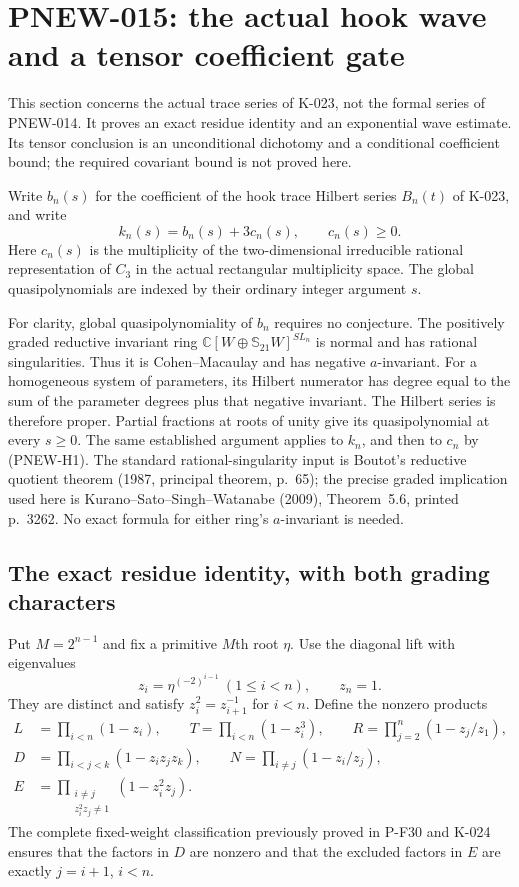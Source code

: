 \section{PNEW-015: the actual hook wave and a tensor coefficient gate}
\label{sec:hook-covariant-gate}

This section concerns the actual trace series of K-023, not the formal
series of PNEW-014. It proves an exact residue identity and an
exponential wave estimate. Its tensor conclusion is an unconditional
dichotomy and a conditional coefficient bound; the required covariant
bound is not proved here.

Write $b_n(s)$ for the coefficient of the hook trace Hilbert series
$B_n(t)$ of K-023, and write
\[
       k_n(s)=b_n(s)+3c_n(s),\qquad c_n(s)\ge0.
                                                        \tag{PNEW-H1}
\]
Here $c_n(s)$ is the multiplicity of the two-dimensional irreducible
rational representation of $C_3$ in the actual rectangular multiplicity
space. The global quasipolynomials are indexed by their ordinary
integer argument $s$.

For clarity, global quasipolynomiality of $b_n$ requires no conjecture.
The positively graded reductive invariant ring
$\mathbb C[W\oplus\mathbb S_{21}W]^{SL_n}$ is normal and has rational
singularities. Thus it is Cohen--Macaulay and has negative $a$-invariant.
For a homogeneous system of parameters, its Hilbert numerator has
degree equal to the sum of the parameter degrees plus that negative
invariant. The Hilbert series is therefore proper. Partial fractions
at roots of unity give its quasipolynomial at every $s\ge0$.
The same established argument applies to $k_n$, and then to $c_n$
by (PNEW-H1). The standard rational-singularity input is Boutot's
reductive quotient theorem (1987, principal theorem, p.~65); the precise
graded implication used here is Kurano--Sato--Singh--Watanabe (2009),
Theorem~5.6, printed p.~3262.
No exact formula for either ring's $a$-invariant is needed.

\subsection*{The exact residue identity, with both grading characters}

Put $M=2^{n-1}$ and fix a primitive $M$th root $\eta$. Use the
diagonal lift with eigenvalues
\[
 z_i=\eta^{(-2)^{i-1}}\ (1\le i<n),\qquad z_n=1.
\]
They are distinct and satisfy $z_i^2=z_{i+1}^{-1}$ for $i<n$.
Define the nonzero products
\[
 \begin{split}
 L&=\prod_{i<n}(1-z_i),\qquad
 T=\prod_{i<n}(1-z_i^3),\qquad
 R=\prod_{j=2}^n(1-z_j/z_1),\\
 D&=\prod_{i<j<k}(1-z_i z_j z_k),\qquad
 N=\prod_{i\ne j}(1-z_i/z_j),\\
 E&=\prod_{\substack{i\ne j\\z_i^2z_j\ne1}}(1-z_i^2z_j).
 \end{split}                                             \tag{PNEW-H2}
\]
The complete fixed-weight classification previously proved in P-F30
and K-024 ensures that the factors in $D$ are nonzero and that the
excluded factors in $E$ are exactly $j=i+1$, $i<n$.


